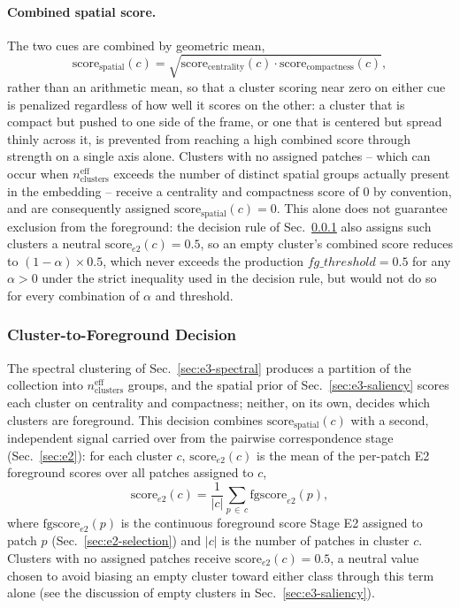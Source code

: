 \paragraph{Combined spatial score.} The two cues are combined by geometric mean,
\[
\text{score}_{\text{spatial}}(c) = \sqrt{\text{score}_{\text{centrality}}(c) \cdot \text{score}_{\text{compactness}}(c)},
\]
rather than an arithmetic mean, so that a cluster scoring near zero on either cue is penalized regardless of how well it scores on the other: a cluster that is compact but pushed to one side of the frame, or one that is centered but spread thinly across it, is prevented from reaching a high combined score through strength on a single axis alone. Clusters with no assigned patches -- which can occur when $n_{\text{clusters}}^{\text{eff}}$ exceeds the number of distinct spatial groups actually present in the embedding -- receive a centrality and compactness score of $0$ by convention, and are consequently assigned $\text{score}_{\text{spatial}}(c)=0$. This alone does not guarantee exclusion from the foreground: the decision rule of Sec.~\ref{sec:e3-decision} also assigns such clusters a neutral $\text{score}_{e2}(c)=0.5$, so an empty cluster's combined score reduces to $(1-\alpha)\times 0.5$, which never exceeds the production $fg\_threshold=0.5$ for any $\alpha>0$ under the strict inequality used in the decision rule, but would not do so for every combination of $\alpha$ and threshold.

\subsubsection{Cluster-to-Foreground Decision}
\label{sec:e3-decision}

The spectral clustering of Sec.~\ref{sec:e3-spectral} produces a partition of the collection into $n_{\text{clusters}}^{\text{eff}}$ groups, and the spatial prior of Sec.~\ref{sec:e3-saliency} scores each cluster on centrality and compactness; neither, on its own, decides which clusters are foreground. This decision combines $\text{score}_{\text{spatial}}(c)$ with a second, independent signal carried over from the pairwise correspondence stage (Sec.~\ref{sec:e2}): for each cluster $c$, $\text{score}_{e2}(c)$ is the mean of the per-patch E2 foreground scores over all patches assigned to $c$,
\[
\text{score}_{e2}(c) = \frac{1}{|c|}\sum_{p \,\in\, c} \text{fgscore}_{e2}(p),
\]
where $\text{fgscore}_{e2}(p)$ is the continuous foreground score Stage E2 assigned to patch $p$ (Sec.~\ref{sec:e2-selection}) and $|c|$ is the number of patches in cluster $c$. Clusters with no assigned patches receive $\text{score}_{e2}(c) = 0.5$, a neutral value chosen to avoid biasing an empty cluster toward either class through this term alone (see the discussion of empty clusters in Sec.~\ref{sec:e3-saliency}).

